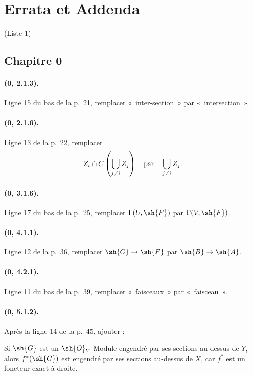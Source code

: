 \clearpage
{}
{}
\section*{Errata et Addenda}
\thispagestyle{plain}
\begin{center}
\large (Liste 1)
\end{center}

\subsection*{Chapitre 0}

\paragraph{(0, 2.1.3).}
Ligne 15 du bas de la p.~21, remplacer «~inter-section~» par
«~intersection~».

\paragraph{(0, 2.1.6).}
Ligne 13 de la p.~22, remplacer
\[
  Z_i\cap C\left(\bigcup_{j\ne i}Z_j\right)
  \quad\hbox{par}\quad
  \bigcup_{j\ne i}Z_j.
\]

\paragraph{(0, 3.1.6).}
Ligne 17 du bas de la p.~25, remplacer
$\Gamma(U,\sh{F})$ par $\Gamma(V,\sh{F})$.

\paragraph{(0, 4.1.1).}
Ligne 12 de la p.~36, remplacer $\sh{G}\to\sh{F}$ par
$\sh{B}\to\sh{A}$.

\paragraph{(0, 4.2.1).}
Ligne 11 du bas de la p.~39, remplacer «~faisceaux~» par «~faisceau~».

\paragraph{(0, 5.1.2).}
Après la ligne 14 de la p.~45, ajouter :

Si $\sh{G}$ est un $\sh{O}_Y$-Module engendré par ses sections au-dessus
de $Y$, alors $f^*(\sh{G})$ est engendré par ses sections au-dessus de
$X$, car $f^*$ est un foncteur exact à droite.

